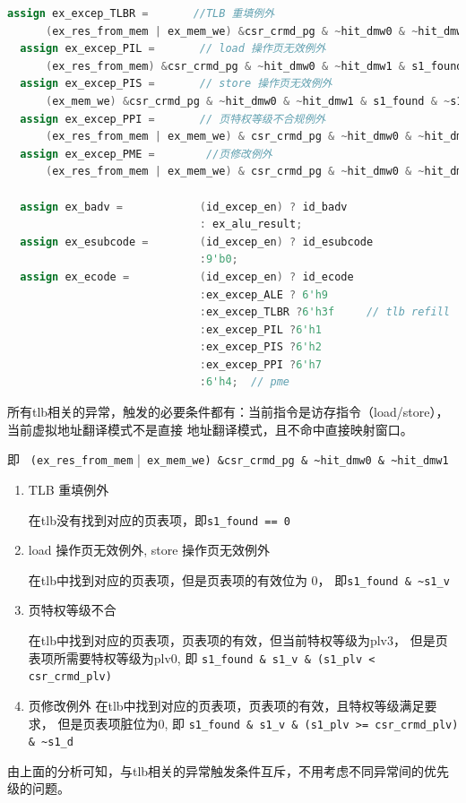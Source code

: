 \documentclass[11pt]{article}
\begin{document}
\begin{enumerate}
\begin{lstlisting}[language=verilog]
  assign ex_excep_TLBR =       //TLB 重填例外
      (ex_res_from_mem | ex_mem_we) &csr_crmd_pg & ~hit_dmw0 & ~hit_dmw1 & ~s1_found;   
  assign ex_excep_PIL =       // load 操作页无效例外
      (ex_res_from_mem) &csr_crmd_pg & ~hit_dmw0 & ~hit_dmw1 & s1_found & ~s1_v;  
  assign ex_excep_PIS =       // store 操作页无效例外
      (ex_mem_we) &csr_crmd_pg & ~hit_dmw0 & ~hit_dmw1 & s1_found & ~s1_v; 
  assign ex_excep_PPI =       // 页特权等级不合规例外
      (ex_res_from_mem | ex_mem_we) & csr_crmd_pg & ~hit_dmw0 & ~hit_dmw1 & s1_found & s1_v & (s1_plv < csr_crmd_plv);
  assign ex_excep_PME =        //页修改例外
      (ex_res_from_mem | ex_mem_we) & csr_crmd_pg & ~hit_dmw0 & ~hit_dmw1 & s1_found & s1_v & (s1_plv >= csr_crmd_plv) & ~s1_d;
  
  assign ex_badv =            (id_excep_en) ? id_badv
                              : ex_alu_result;
  assign ex_esubcode =        (id_excep_en) ? id_esubcode
                              :9'b0;
  assign ex_ecode =           (id_excep_en) ? id_ecode
                              :ex_excep_ALE ? 6'h9
                              :ex_excep_TLBR ?6'h3f     // tlb refill
                              :ex_excep_PIL ?6'h1
                              :ex_excep_PIS ?6'h2
                              :ex_excep_PPI ?6'h7
                              :6'h4;  // pme
\end{lstlisting}
 所有tlb相关的异常，触发的必要条件都有：当前指令是访存指令（load/store）， 当前虚拟地址翻译模式不是直接
  地址翻译模式，且不命中直接映射窗口。


  即 \verb| (ex_res_from_mem| |\verb| ex_mem_we) &csr_crmd_pg & ~hit_dmw0 & ~hit_dmw1|
  \begin{enumerate}
    \item TLB 重填例外 
    
    在tlb没有找到对应的页表项，即\verb|s1_found == 0|

    \item load 操作页无效例外, store 操作页无效例外
    
    在tlb中找到对应的页表项，但是页表项的有效位为 0， 即\verb |s1_found & ~s1_v|
    
    \item  页特权等级不合
    
    在tlb中找到对应的页表项，页表项的有效，但当前特权等级为plv3， 但是页表项所需要特权等级为plv0, 
    即 \verb|s1_found & s1_v & (s1_plv < csr_crmd_plv)|

    \item 页修改例外
    在tlb中找到对应的页表项，页表项的有效，且特权等级满足要求， 但是页表项脏位为0, 
    即 \verb|s1_found & s1_v & (s1_plv >= csr_crmd_plv) & ~s1_d|
  \end{enumerate}
  由上面的分析可知，与tlb相关的异常触发条件互斥，不用考虑不同异常间的优先级的问题。
\end{enumerate}
\end{document}
